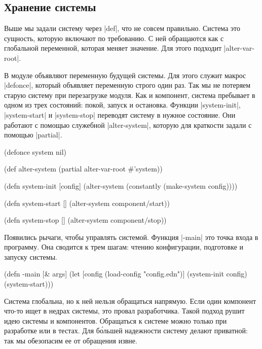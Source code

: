 \subsection{Хранение системы}

Выше мы задали систему через \spverb|def|, что не совсем правильно. Система это
сущность, которую включают по требованию. С ней обращаются как с глобальной
переменной, которая меняет значение. Для этого подходит \spverb|alter-var-root|.

В модуле объявляют переменную будущей системы. Для этого служит макрос
\spverb|defonce|, который объявляет переменную строго один раз. Так мы не
потеряем старую систему при перезагрузке модуля. Как и компонент, система
пребывает в одном из трех состояний: покой, запуск и остановка. Функции
\spverb|system-init|, \spverb|system-start| и \spverb|system-stop| переводят
систему в нужное состояние. Они работают с помощью служебной
\spverb|alter-system|, которую для краткости задали с помощью \spverb|partial|.

\begin{english}
  \begin{clojure}
(defonce system nil)

(def alter-system (partial alter-var-root #'system))

(defn system-init [config]
  (alter-system (constantly (make-system config))))

(defn system-start []
  (alter-system component/start))

(defn system-stop []
  (alter-system component/stop))
  \end{clojure}
\end{english}

Появились рычаги, чтобы управлять системой. Функция \spverb|-main| это точка
входа в программу. Она сводится к трем шагам: чтению конфигурации, подготовке и
запуску системы.

\begin{english}
  \begin{clojure}
(defn -main [& args]
  (let [config (load-config "config.edn")]
    (system-init config)
    (system-start)))
  \end{clojure}
\end{english}

Система глобальна, но к ней нельзя обращаться напрямую. Если один компонент
что-то ищет в недрах системы, это провал разработчика. Такой подход рушит идею
системы и компонентов. Обращаться к системе можно только при разработке или в
тестах. Для б\'{о}льшей надежности систему делают приватной: так мы обезопасим
ее от обращения извне.

